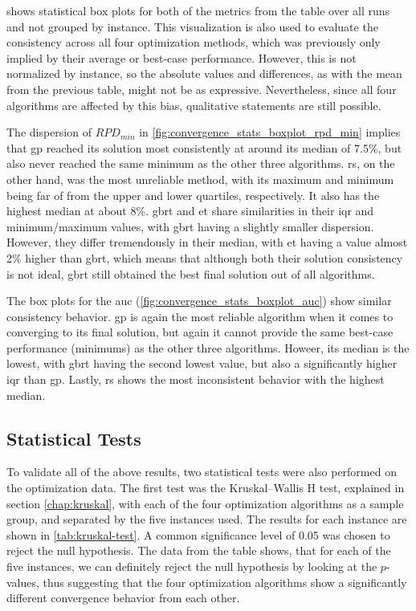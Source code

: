  shows statistical box plots for both of the metrics from the table over all runs and not grouped by instance. This visualization is also used to evaluate the consistency across all four optimization methods, which was previously only implied by their average or best-case performance. However, this is not normalized by instance, so the absolute values and differences, as with the mean from the previous table, might not be as expressive. Nevertheless, since all four algorithms are affected by this bias, qualitative statements are still possible.

The dispersion of $RPD_{min}$ in \cref{fig:convergence_stats_boxplot_rpd_min} implies that \gls{gp} reached its solution most consistently at around its median of 7.5\%, but also never reached the same minimum as the other three algorithms. \gls{rs}, on the other hand, was the most unreliable method, with its maximum and minimum being far of from the upper and lower quartiles, respectively. It also has the highest median at about 8\%. \gls{gbrt} and \gls{et} share similarities in their \gls{iqr} and minimum/maximum values, with \gls{gbrt} having a slightly smaller dispersion. However, they differ tremendously in their median, with \gls{et} having a value almost 2\% higher than \gls{gbrt}, which means that although both their solution consistency is not ideal, \gls{gbrt} still obtained the best final solution out of all algorithms.

The box plots for the \gls{auc} (\cref{fig:convergence_stats_boxplot_auc}) show similar consistency behavior. \gls{gp} is again the most reliable algorithm when it comes to converging to its final solution, but again it cannot provide the same best-case performance (minimums) as the other three algorithms. Howeer, its median is the lowest, with \gls{gbrt} having the second lowest value, but also a significantly higher \gls{iqr} than \gls{gp}. Lastly, \gls{rs} shows the most inconsistent behavior with the highest median. 

\subsection{Statistical Tests}

To validate all of the above results, two statistical tests were also performed on the optimization data. The first test was the Kruskal–Wallis H test, explained in section \cref{chap:kruskal}, with each of the four optimization algorithms as a sample group, and separated by the five instances used. The results for each instance are shown in \cref{tab:kruskal-test}. A common significance level of 0.05 was chosen to reject the null hypothesis. The data from the table shows, that for each of the five instances, we can definitely reject the null hypothesis by looking at the $p$-values, thus suggesting that the four optimization algorithms show a significantly different convergence behavior from each other. 


